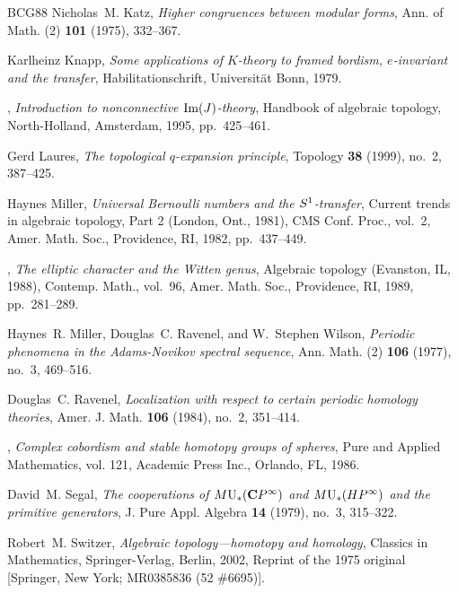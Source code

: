 \documentclass[10pt,a4paper]{amsart}
\theoremstyle{definition}
\theoremstyle{remark}
\begin{document}
\begin{thebibliography}{BCG{\etalchar{+}}88}
Nicholas~M. Katz, \emph{Higher congruences between modular forms}, Ann. of
  Math. (2) \textbf{101} (1975), 332--367. 

Karlheinz Knapp, \emph{Some applications of ${K}$-theory to framed bordism,
  $e$-invariant and the transfer}, Habilitationschrift, Universität Bonn,
  1979.

\bysame, \emph{Introduction to nonconnective {${\rm Im}(J)$}-theory}, Handbook
  of algebraic topology, North-Holland, Amsterdam, 1995, pp.~425--461.

Gerd Laures, \emph{The topological {$q$}-expansion principle}, Topology
  \textbf{38} (1999), no.~2, 387--425. 

Haynes Miller, \emph{Universal {B}ernoulli numbers and the
  {$S\sp{1}$}-transfer}, Current trends in algebraic topology, {P}art 2
  ({L}ondon, {O}nt., 1981), CMS Conf. Proc., vol.~2, Amer. Math. Soc.,
  Providence, RI, 1982, pp.~437--449. 

\bysame, \emph{The elliptic character and the {W}itten genus}, Algebraic
  topology ({E}vanston, {IL}, 1988), Contemp. Math., vol.~96, Amer. Math. Soc.,
  Providence, RI, 1989, pp.~281--289. 

Haynes~R. Miller, Douglas~C. Ravenel, and W.~Stephen Wilson, \emph{Periodic
  phenomena in the {A}dams-{N}ovikov spectral sequence}, Ann. Math. (2)
  \textbf{106} (1977), no.~3, 469--516. 

Douglas~C. Ravenel, \emph{Localization with respect to certain periodic
  homology theories}, Amer. J. Math. \textbf{106} (1984), no.~2, 351--414.

\bysame, \emph{Complex cobordism and stable homotopy groups of spheres}, Pure
  and Applied Mathematics, vol. 121, Academic Press Inc., Orlando, FL, 1986.

David~M. Segal, \emph{The cooperations of {$M{\rm U}\sb\ast ({\bf C}P^{\infty
  })$} and {$M{\rm U}\sb\ast (HP^{\infty })$} and the primitive generators}, J.
  Pure Appl. Algebra \textbf{14} (1979), no.~3, 315--322. 

Robert~M. Switzer, \emph{Algebraic topology---homotopy and homology}, Classics
  in Mathematics, Springer-Verlag, Berlin, 2002, Reprint of the 1975 original
  [Springer, New York; MR0385836 (52 \#6695)]. 

\end{thebibliography}
\end{document}
